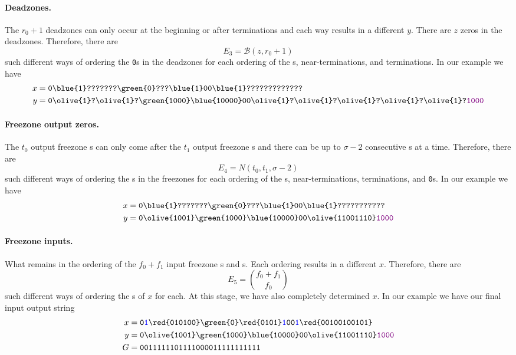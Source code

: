 \paragraph{Deadzones.}
The $r_0+1$ deadzones can only occur at the beginning or after terminations and each way results in a different $y$. There are $z$ zeros in the deadzones. Therefore, there are
$$
E_3=\mathcal{B}(z,r_0+1)
$$
such different ways of ordering the \texttt{0}s in the deadzones for each ordering of the \texttt{}s, near-terminations, and terminations. In our example we have
\begin{align*}
  x&=\texttt{0\blue{1}???????\green{0}???\blue{1}00\blue{1}?????????????}\\
  y&=\texttt{0\olive{1}?\olive{1}?\green{1000}\blue{10000}00\olive{1}?\olive{1}?\olive{1}?\olive{1}?\olive{1}?\textcolor{violet}{1000}}
\end{align*}

\paragraph{Freezone output zeros.}
The $t_0$ output freezone {}s can only come after the $t_1$ output freezone {}s and there can be up to $\sigma-2$ consecutive s at a time. Therefore, there are
$$
E_4=N(t_0,t_1,\sigma-2)
$$ such different ways of ordering the \texttt{}s in the freezones for each ordering of the \texttt{}s, near-terminations, terminations, and \texttt{0}s. In our example we have
\begin{align*}
  x&=\texttt{0\blue{1}???????\green{0}???\blue{1}00\blue{1}???????????}\\
  y&=\texttt{0\olive{1001}\green{1000}\blue{10000}00\olive{11001110}\textcolor{violet}{1000}}
\end{align*}

\paragraph{Freezone inputs.}
What remains in the ordering of the $f_0+f_1$ input freezone \texttt{}s and \texttt{}s. Each ordering results in a different $x$. Therefore, there are
$$
E_5=\binom{f_0+f_1}{f_0}
$$
such different ways of ordering the \texttt{}s of $x$ for each. At this stage, we have also completely determined $x$. In our example we have our final input output string
\begin{align*}
  x&=\texttt{0\textcolor{blue}{1}\red{010100}\green{0}\red{0101}\textcolor{blue}{1}00\textcolor{blue}{1}\red{00100100101}}\\
  y&=\texttt{0\olive{1001}\green{1000}\blue{10000}00\olive{11001110}\textcolor{violet}{1000}}\\
  G&=\texttt{0011111101111000011111111111}
\end{align*}

